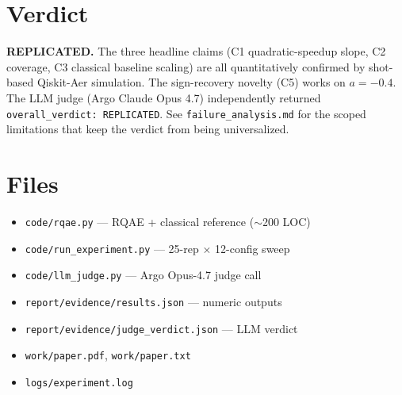 \documentclass[11pt]{article}
\begin{document}
\section{Verdict}
\textbf{REPLICATED.} The three headline claims (C1 quadratic-speedup slope,
C2 coverage, C3 classical baseline scaling) are all quantitatively confirmed
by shot-based Qiskit-Aer simulation. The sign-recovery novelty (C5) works on
$a = -0.4$. The LLM judge (Argo Claude Opus 4.7) independently returned
\texttt{overall\_verdict: REPLICATED}. See \texttt{failure\_analysis.md} for
the scoped limitations that keep the verdict from being universalized.



\section{Files}
\begin{itemize}
  \item \texttt{code/rqae.py} --- RQAE + classical reference ($\sim$200 LOC)
  \item \texttt{code/run_experiment.py} --- 25-rep $\times$ 12-config sweep
  \item \texttt{code/llm\_judge.py} --- Argo Opus-4.7 judge call
  \item \texttt{report/evidence/results.json} --- numeric outputs
  \item \texttt{report/evidence/judge\_verdict.json} --- LLM verdict
  \item \texttt{work/paper.pdf}, \texttt{work/paper.txt}
  \item \texttt{logs/experiment.log}
\end{itemize}
\end{document}
